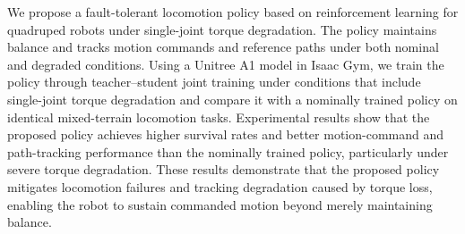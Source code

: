 We propose a fault-tolerant locomotion policy based on reinforcement learning for quadruped robots under single-joint torque degradation. The policy maintains balance and tracks motion commands and reference paths under both nominal and degraded conditions. Using a Unitree A1 model in Isaac Gym, we train the policy through teacher–student joint training under conditions that include single-joint torque degradation and compare it with a nominally trained policy on identical mixed-terrain locomotion tasks. Experimental results show that the proposed policy achieves higher survival rates and better motion-command and path-tracking performance than the nominally trained policy, particularly under severe torque degradation. These results demonstrate that the proposed policy mitigates locomotion failures and tracking degradation caused by torque loss, enabling the robot to sustain commanded motion beyond merely maintaining balance.
